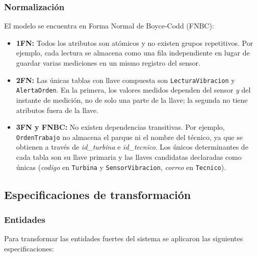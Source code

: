 \documentclass[11pt,a4paper]{article}
\begin{document}
\subsubsection{Normalización}

El modelo se encuentra en Forma Normal de Boyce-Codd (FNBC):

\begin{itemize}
    \item \textbf{1FN:} Todos los atributos son atómicos y no existen grupos
    repetitivos. Por ejemplo, cada lectura se almacena como una fila independiente en
    lugar de guardar varias mediciones en un mismo registro del sensor.

    \item \textbf{2FN:} Las únicas tablas con llave compuesta son
    \texttt{LecturaVibracion} y \texttt{AlertaOrden}. En la primera, los valores
    medidos dependen del sensor \textit{y} del instante de medición, no de solo una
    parte de la llave; la segunda no tiene atributos fuera de la llave.

    \item \textbf{3FN y FNBC:} No existen dependencias transitivas. Por ejemplo,
    \texttt{OrdenTrabajo} no almacena el parque ni el nombre del técnico, ya que se
    obtienen a través de \textit{id\_turbina} e \textit{id\_tecnico}. Los únicos
    determinantes de cada tabla son su llave primaria y las llaves candidatas
    declaradas como únicas (\textit{codigo} en \texttt{Turbina} y
    \texttt{SensorVibracion}, \textit{correo} en \texttt{Tecnico}).
\end{itemize}

\subsection{Especificaciones de transformación}

\subsubsection{Entidades}

Para transformar las entidades fuertes del sistema se aplicaron las siguientes
especificaciones:
\end{document}
